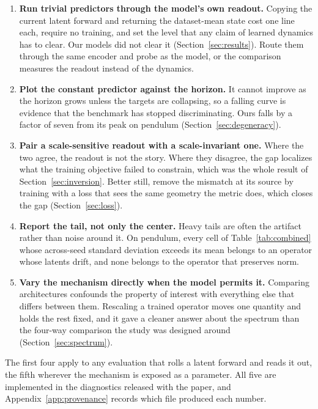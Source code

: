 \documentclass[10pt]{article} %
\begin{document}
\begin{enumerate}
\item \textbf{Run trivial predictors through the model's own readout.} Copying the current latent forward and returning the dataset-mean state cost one line each, require no training, and set the level that any claim of learned dynamics has to clear. Our models did not clear it (Section~\ref{sec:results}). Route them through the same encoder and probe as the model, or the comparison measures the readout instead of the dynamics.

\item \textbf{Plot the constant predictor against the horizon.} It cannot improve as the horizon grows unless the targets are collapsing, so a falling curve is evidence that the benchmark has stopped discriminating. Ours falls by a factor of seven from its peak on pendulum (Section~\ref{sec:degeneracy}).

\item \textbf{Pair a scale-sensitive readout with a scale-invariant one.} Where the two agree, the readout is not the story. Where they disagree, the gap localizes what the training objective failed to constrain, which was the whole result of Section~\ref{sec:inversion}. Better still, remove the mismatch at its source by training with a loss that sees the same geometry the metric does, which closes the gap (Section~\ref{sec:loss}).

\item \textbf{Report the tail, not only the center.} Heavy tails are often the artifact rather than noise around it. On pendulum, every cell of Table~\ref{tab:combined} whose across-seed standard deviation exceeds its mean belongs to an operator whose latents drift, and none belongs to the operator that preserves norm.

\item \textbf{Vary the mechanism directly when the model permits it.} Comparing architectures confounds the property of interest with everything else that differs between them. Rescaling a trained operator moves one quantity and holds the rest fixed, and it gave a cleaner answer about the spectrum than the four-way comparison the study was designed around (Section~\ref{sec:spectrum}).
\end{enumerate}

The first four apply to any evaluation that rolls a latent forward and reads it out, the fifth wherever the mechanism is exposed as a parameter. All five are implemented in the diagnostics released with the paper, and Appendix~\ref{app:provenance} records which file produced each number.
\end{document}
